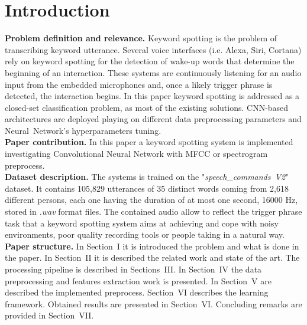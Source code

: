 
\section{Introduction}
\label{sec:introduction}
\noindent \textbf{Problem definition and relevance.} Keyword spotting is the problem of transcribing keyword utterance. Several voice interfaces (i.e. Alexa, Siri, Cortana) rely on keyword spotting for the detection of wake-up words that determine the beginning of an interaction. These systems are continuously listening for an audio input from the embedded microphones and, once a likely trigger phrase is detected, the interaction begins. 
In this paper keyword spotting is addressed as a closed-set classification problem, as most of the existing solutions. CNN-based architectures are deployed playing on different data preprocessing parameters and \mbox{Neural Network's} hyperparameters tuning.\\

\noindent \textbf{Paper contribution.} In this paper a keyword spotting system is implemented investigating Convolutional Neural Network with MFCC or spectrogram preprocess. \\

\noindent \textbf{Dataset description.} \cite{Warden-2018} The systems is trained on the \mbox{"{\it speech\_commands V2}"} dataset. It contains 105,829 utterances of 35 distinct words coming from 2,618 different persons, each one having the duration of at most one second, 16000 Hz, stored in {\it .wav} format files. The contained audio allow to reflect the trigger phrase task that a keyword spotting system aims at achieving and cope with noisy environments, poor quality recording tools or people taking in a natural way. \\ 

\noindent \textbf{Paper structure.} In Section~I it is introduced the problem and what is done in the paper. In Section~II it is described the related work and state of the art. The processing pipeline is described in Sections~III. In Section~IV the data preprocessing and features extraction work is presented. In Section~V are described the implemented preprocess. Section~VI describes the learning framework. Obtained results are presented in Section~VI.  Concluding remarks are provided in Section~VII.


